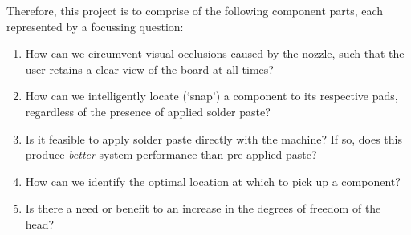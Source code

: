 \documentclass[a4paper, 11pt]{article}
\begin{document}
Therefore, this project is to comprise of the following component parts, each represented by a focussing question:
\begin{enumerate}
	\item How can we circumvent visual occlusions caused by the nozzle, such that the user retains a clear view of the board at all times?
	\item How can we intelligently locate (`snap') a component to its respective pads, regardless of the presence of applied solder paste?
	\item Is it feasible to apply solder paste directly with the machine? If so, does this produce \emph{better} system performance than pre-applied paste?
	\item How can we identify the optimal location at which to pick up a component?
	\item Is there a need or benefit to an increase in the degrees of freedom of the head?
\end{enumerate}

\nocite{*}


\end{document}
